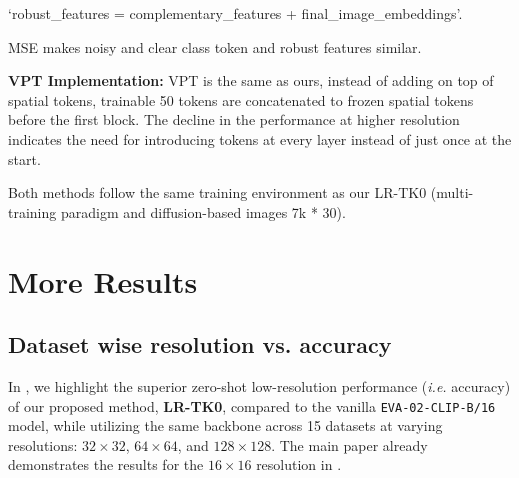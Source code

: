 `robust\_features = complementary\_features + final\_image\_embeddings'.

MSE makes noisy and clear class token and robust features similar. 


\noindent \textbf{VPT Implementation:}
VPT is the same as ours, instead of adding on top of spatial tokens, trainable 50 tokens are concatenated to frozen spatial tokens before the first block. 
The decline in the performance at higher resolution indicates the need for introducing tokens at every layer instead of just once at the start. 

Both methods follow the same training environment as our LR-TK0 (multi-training paradigm and diffusion-based images 7k * 30).







\section{More Results}



\subsection{Dataset wise resolution vs. accuracy}

In \textbf{}, we highlight the superior zero-shot low-resolution performance (\emph{i.e.} accuracy) of our proposed method, \textbf{LR-TK0}, compared to the vanilla \texttt{EVA-02-CLIP-B/16} model, while utilizing the same backbone across 15 datasets at varying resolutions: $32\times32$, $64\times64$, and $128\times128$. The main paper already demonstrates the results for the $16\times16$ resolution in .


